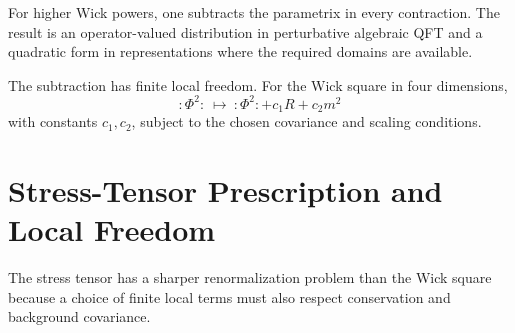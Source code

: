 For higher Wick powers, one subtracts the parametrix in every contraction.
The result is an operator-valued distribution in perturbative algebraic QFT
and a quadratic form in representations where the required domains are
available.

The subtraction has finite local freedom.  For the Wick square in four
dimensions,
\[
  :\!\Phi^2\!:\ \mapsto\ :\!\Phi^2\!:+c_1R+c_2m^2
\]
with constants \(c_1,c_2\), subject to the chosen covariance and scaling
conditions.

\section{Stress-Tensor Prescription and Local Freedom}
\label{sec:stress-tensor-prescription-local-freedom}

The stress tensor has a sharper renormalization problem than the Wick square
because a choice of finite local terms must also respect conservation and
background covariance.

